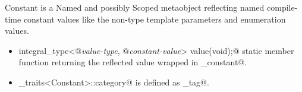 {\metaobject Constant} is a {\metaobject Named} and possibly {\metaobject Scoped} metaobject reflecting
named compile-time constant values like the non-type template parameters and enumeration values.

\begin{itemize}
	\item{\verb@static integral_type<@{\em value-type}\verb@, @{\em constant-value}\verb@> value(void);@}
	static member function returning the reflected value wrapped in \verb@integral_constant@.

	\item \verb@metaobject_traits<Constant>::category@ is defined as \verb@constant_tag@.
\end{itemize}

